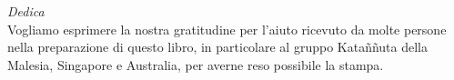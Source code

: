 \cleartoverso
\begin{quotepage}{80mm}
\centering
\emph{Dedica}\\[0.4\baselineskip]
Vogliamo esprimere la nostra gratitudine per l’aiuto ricevuto da molte persone
nella preparazione di questo libro, in particolare al gruppo Kataññuta della
Malesia, Singapore e Australia, per averne reso possibile la stampa.

\end{quotepage}

